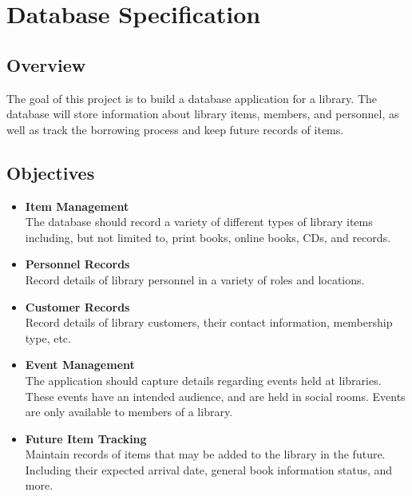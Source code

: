 \documentclass[11pt,a4paper]{article}
\begin{document}

\begin{titlepage}
   {\Huge
     
   }
\end{titlepage}

\section{Database Specification}

\subsection{Overview}

The goal of this project is to build a database application for a library. The database will store information about library items, members, and personnel, as well as track the borrowing process and keep future records of items. 

\subsection{Objectives}

\begin{itemize}
    \item{\textbf{Item Management}}\\
    The database should record a variety of different types of library items including, but not limited to, print books, online books, CDs, and records.
    \item{\textbf{Personnel Records}}\\
    Record details of library personnel in a variety of roles and locations.
    \item{\textbf{Customer Records}}\\
    Record details of library customers, their contact information, membership type, etc.
    \item{\textbf{Event Management}}\\
    The application should capture details regarding events held at libraries. These events have an intended audience, and are held in social rooms. Events are only available to members of a library.
    \item{\textbf{Future Item Tracking}}\\
    Maintain records of items that may be added to the library in the future. Including their expected arrival date, general book information status, and more.
    
\end{itemize}
\end{document}
